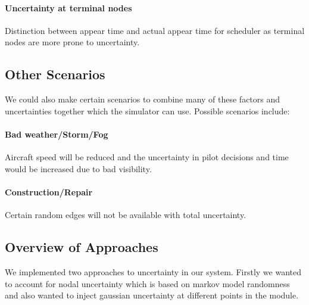\documentclass[conference]{IEEEtran}
\begin{document}
\paragraph{Uncertainty at terminal nodes} Distinction between appear time and actual appear time for scheduler as terminal nodes are more prone to uncertainty.

\subsection{Other Scenarios}
We could also make certain scenarios to combine many of these factors and uncertainties together which the simulator can use. Possible scenarios include:

\paragraph{Bad weather/Storm/Fog} Aircraft speed will be reduced and the uncertainty in pilot decisions and time would be increased due to bad visibility.

\paragraph{Construction/Repair} Certain random edges will not be available with total uncertainty.

\subsection{Overview of Approaches}

We implemented two approaches to uncertainty in our system. Firstly we wanted to account for nodal uncertainty which is based on markov model randomness and also wanted to inject gaussian uncertainty at different points in the module.
\end{document}
